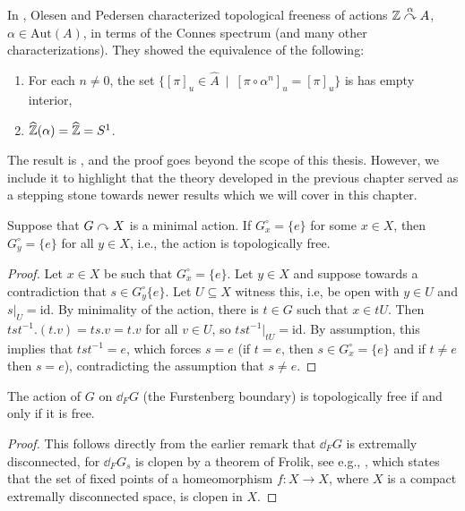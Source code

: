 \begin{remark}
	In \cite{olesenpedersen3}, Olesen and Pedersen characterized topological freeness of actions $\mathbb{Z} \stackrel{\alpha}{\curvearrowright} A$, $\alpha \in \mathrm{Aut}(A)$, in terms of the Connes spectrum (and many other characterizations). They showed the equivalence of the following:
	\begin{enumerate}[nosep]
		\item For each $n \neq 0$, the set $\{ [\pi]_u \in \hat A \ \mid \ [\pi \circ \alpha^{n}]_u = [\pi]_u\}$ is has empty interior,
		\item $\widehat{\mathbb{Z}}(\alpha) = \widehat{\mathbb{Z}} = S^1$.
	\end{enumerate}
	The result is \cite[Theorem 10.4]{olesenpedersen3}, and the proof goes beyond the scope of this thesis. However, we include it to highlight that the theory developed in the previous chapter served as a stepping stone towards newer results which we will cover in this chapter.
\end{remark}
\begin{lemma}
	Suppose that $G \stackrel{}{\curvearrowright} X$ is a minimal action. If $G_x^\circ = \{e\}$ for some $x \in X$, then $G_y^\circ = \{e\}$ for all $y \in X$, i.e., the action is topologically free.
	\label{topfreeminimal}
\end{lemma}
\begin{proof}
	Let $x \in X$ be such that $G_x^\circ = \{e\}$. Let $y \in X$ and suppose towards a contradiction that $s \in G_y^\circ\{e\}$. Let $U \subseteq X$ witness this, i.e, be open with $y \in U$ and $s|_U=\mathrm{id}$. By minimality of the action, there is $t \in G$ such that $x \in tU$. Then $tst^{-1}.(t.v) =  ts.v = t.v$ for all $v \in U$, so $tst^{-1}|_{tU}=  \mathrm{id}$. By assumption, this implies that $tst^{-1} = e$, which forces $s = e$ (if $t = e$, then $s \in G_x^\circ = \{e\}$ and if $t \neq e$ then $s = e$), contradicting the assumption that $s \neq e$. 
\end{proof}
\begin{corollary}
	The action of $G$ on $\dd_F G$ (the Furstenberg boundary) is topologically free if and only if it is free.
\end{corollary}
\begin{proof}
	This follows directly from the earlier remark that $\dd_F G$ is extremally disconnected, for $\dd_F G_s$ is clopen by a theorem of Frolik, see e.g., \cite[Theorem 3.1]{frolik1971maps}, which states that the set of fixed points of a homeomorphism $f \colon X \to X$, where $X$ is a compact extremally disconnected space, is clopen in $X$.
\end{proof}
